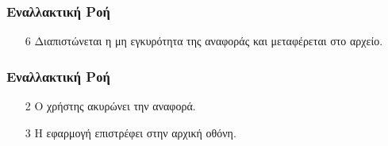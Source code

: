 \subsubsection{Εναλλακτική Ροή}

\begin{enumerate}
    \item[6] Διαπιστώνεται η μη εγκυρότητα της αναφοράς και μεταφέρεται στο αρχείο.
\end{enumerate}

\subsubsection{Εναλλακτική Ροή}

\begin{enumerate}
    \item[2] Ο χρήστης ακυρώνει την αναφορά.
    \item[3] Η εφαρμογή επιστρέφει στην αρχική οθόνη.
\end{enumerate}
